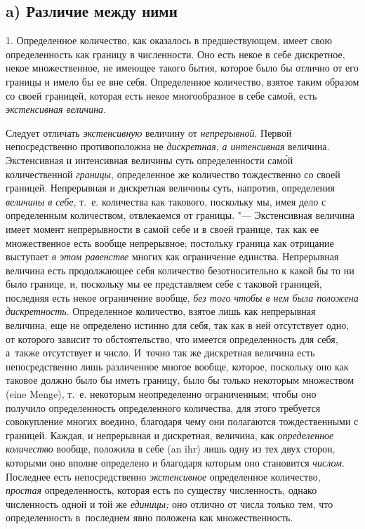 
\subsection[a) Различие между ними]{a) Различие между ними}

1. Определенное количество, как оказалось в предшествующем, имеет свою
определенность как границу в численности. Оно есть некое в себе дискретное,
некое множественное, не имеющее такого бытия, которое было бы отлично от его
границы и имело бы ее вне себя. Определенное количество, взятое таким образом
со своей границей, которая есть некое многообразное в себе самой, есть
{\em экстенсивная величина}.

Следует отличать {\em экстенсивную} величину от {\em непрерывной}. Первой
непосредственно противоположна не {\em дискретная}, {\em а интенсивная}
величина. Экстенсивная и интенсивная величины суть определенности сам\'{о}й
количественной {\em границы}, определенное же количество тождественно со своей
границей. Непрерывная и дискретная величины суть, напротив, определения
{\em величины в себе}, т.~е. количества как такового, поскольку мы, имея дело
с определенным количеством, отвлекаемся от границы. "--- Экстенсивная величина
имеет момент непрерывности в самой себе и в своей границе, так как ее
множественное есть вообще непрерывное; постольку граница как отрицание
выступает {\em в этом равенстве} многих как ограничение единства. Непрерывная
величина есть продолжающее себя количество безотносительно к какой бы то ни
было границе, и, поскольку мы ее представляем себе с таковой границей,
последняя есть некое ограничение вообще, {\em без того чтобы в нем была
положена дискретность}. Определенное количество, взятое лишь как непрерывная
величина, еще не определено истинно для себя, так как в ней отсутствует одно,
от которого зависит то обстоятельство, что имеется определенность для себя,
а~также отсутствует и число. И~точно так же дискретная величина есть
непосредственно лишь различенное многое вообще, которое, поскольку оно как
таковое должно было бы иметь границу, было бы только некоторым множеством (eine
Men\-ge), т.~е. некоторым неопределенно ограниченным; чтобы оно получило
определенность определенного количества, для этого требуется совокупление
многих воедино, благодаря чему они полагаются тождественными с границей.
Каждая, и непрерывная и дискретная, величина, как {\em определенное количество}
вообще, положила в себе (an ihr) лишь одну из тех двух сторон, которыми оно
вполне определено и благодаря которым оно становится {\em числом}. Последнее
есть непосредственно {\em экстенсивное} определенное количество, {\em простая}
определенность, которая есть по существу численность, однако численность одной
и той же {\em единицы;} оно отлично от числа только тем, что определенность
в~последнем явно положена как множественность.

